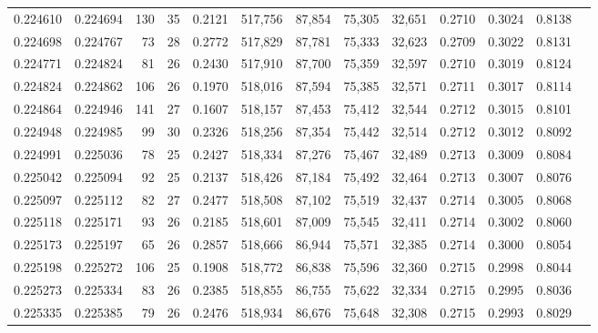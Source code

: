 \begin{tabular}{rrrrrrrrrrrrr}
0.224610 & 0.224694 & 130 &  35 &                                     0.2121 & 517,756 &  87,854 &  75,305 &  32,651 & 0.2710 & 0.3024 & 0.8138 \\
0.224698 & 0.224767 &  73 &  28 &                                     0.2772 & 517,829 &  87,781 &  75,333 &  32,623 & 0.2709 & 0.3022 & 0.8131 \\
0.224771 & 0.224824 &  81 &  26 &                                     0.2430 & 517,910 &  87,700 &  75,359 &  32,597 & 0.2710 & 0.3019 & 0.8124 \\
0.224824 & 0.224862 & 106 &  26 &                                     0.1970 & 518,016 &  87,594 &  75,385 &  32,571 & 0.2711 & 0.3017 & 0.8114 \\
0.224864 & 0.224946 & 141 &  27 &                                     0.1607 & 518,157 &  87,453 &  75,412 &  32,544 & 0.2712 & 0.3015 & 0.8101 \\
0.224948 & 0.224985 &  99 &  30 &                                     0.2326 & 518,256 &  87,354 &  75,442 &  32,514 & 0.2712 & 0.3012 & 0.8092 \\
0.224991 & 0.225036 &  78 &  25 &                                     0.2427 & 518,334 &  87,276 &  75,467 &  32,489 & 0.2713 & 0.3009 & 0.8084 \\
0.225042 & 0.225094 &  92 &  25 &                                     0.2137 & 518,426 &  87,184 &  75,492 &  32,464 & 0.2713 & 0.3007 & 0.8076 \\
0.225097 & 0.225112 &  82 &  27 &                                     0.2477 & 518,508 &  87,102 &  75,519 &  32,437 & 0.2714 & 0.3005 & 0.8068 \\
0.225118 & 0.225171 &  93 &  26 &                                     0.2185 & 518,601 &  87,009 &  75,545 &  32,411 & 0.2714 & 0.3002 & 0.8060 \\
0.225173 & 0.225197 &  65 &  26 &                                     0.2857 & 518,666 &  86,944 &  75,571 &  32,385 & 0.2714 & 0.3000 & 0.8054 \\
0.225198 & 0.225272 & 106 &  25 &                                     0.1908 & 518,772 &  86,838 &  75,596 &  32,360 & 0.2715 & 0.2998 & 0.8044 \\
0.225273 & 0.225334 &  83 &  26 &                                     0.2385 & 518,855 &  86,755 &  75,622 &  32,334 & 0.2715 & 0.2995 & 0.8036 \\
0.225335 & 0.225385 &  79 &  26 &                                     0.2476 & 518,934 &  86,676 &  75,648 &  32,308 & 0.2715 & 0.2993 & 0.8029 \\

\end{tabular}
